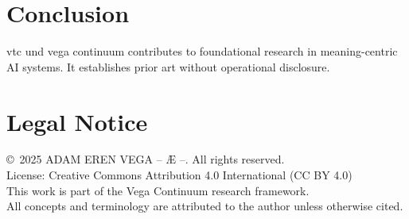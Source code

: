 \documentclass[12pt,a4paper]{article}
\begin{document}
\section{Conclusion}
vtc und vega continuum contributes to foundational research in meaning-centric AI systems. It establishes prior art without operational disclosure.

\section*{Legal Notice}
\copyright\ 2025 ADAM EREN VEGA – Æ –. All rights reserved.\\
License: Creative Commons Attribution 4.0 International (CC BY 4.0)\\
This work is part of the Vega Continuum research framework.\\
All concepts and terminology are attributed to the author unless otherwise cited.
\end{document}
